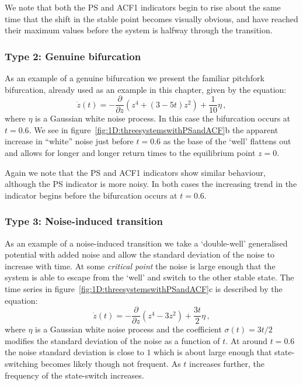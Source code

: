 {{We note that both the PS and ACF1 indicators begin to rise about the same time that the shift in the stable point becomes visually obvious, and have reached their maximum values before the system is halfway through the transition. 

\subsubsection{Type 2: Genuine bifurcation}
As an example of a genuine bifurcation we present the familiar pitchfork bifurcation, already used as an example in this chapter, given by the equation:
	\begin{equation}
	\label{eqn:1D:DifferentTypesOfTipping:genuine}
		\dot{z}(t) = -\frac{\partial }{\partial z}\left(z^4+(3-5t)z^2\right) + \frac{1}{10}\eta\,,
	\end{equation}
where $\eta$ is a Gaussian white noise process. In this case the bifurcation occurs at $t=0.6$. We see in figure~\ref{fig:1D:threesystemswithPSandACF}b the apparent increase in ``white'' noise just before $t=0.6$ as the base of the `well' flattens out and allows for longer and longer return times to the equilibrium point $z=0$.

Again we note that the PS and ACF1 indicators show similar behaviour, although the PS indicator is more noisy. In both cases the increasing trend in the indicator begins before the bifurcation occurs at $t=0.6$.


\subsubsection{Type 3: Noise-induced transition}
As an example of a noise-induced transition we take a `double-well' generalised potential with added noise and allow the standard deviation of the noise to increase with time. At some \emph{critical point} the noise is large enough that the system is able to escape from the `well' and switch to the other stable state. The time series in figure~\ref{fig:1D:threesystemswithPSandACF}c is described by the equation:
\begin{equation}
\label{eqn:1D:DifferentTypesOfTipping:noise-induced}
\dot{z}(t) = -\frac{\partial }{\partial z}\left(z^4-3z^2\right) + \frac{3t}{2} \eta\,,
\end{equation}
where $\eta$ is a Gaussian white noise process and the coefficient $\sigma(t) = 3t/2$ modifies the standard deviation of the noise as a function of $t$. At around $t=0.6$ the noise standard deviation is close to $1$ which is about large enough that state-switching becomes likely though not frequent. As $t$ increases further, the frequency of the state-switch increases. 

}}
